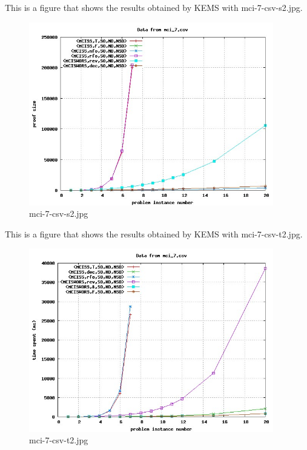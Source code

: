 This is a figure that shows the results obtained by KEMS with mci-7-csv-s2.jpg.
\begin{figure}[htbp]
\begin{center}
\includegraphics[width=0.95\textwidth]{figuras/mci-7-csv-s2.jpg}
\end{center}
\caption{mci-7-csv-s2.jpg}
\end{figure}

This is a figure that shows the results obtained by KEMS with mci-7-csv-t2.jpg.
\begin{figure}[htbp]
\begin{center}
\includegraphics[width=0.95\textwidth]{figuras/mci-7-csv-t2.jpg}
\end{center}
\caption{mci-7-csv-t2.jpg}
\end{figure}

